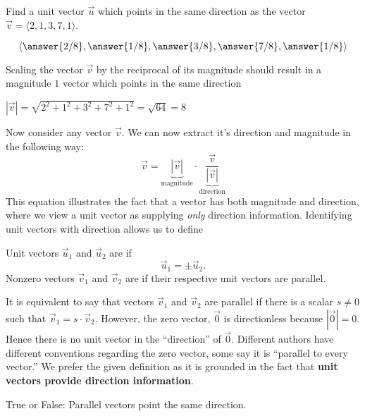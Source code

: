 \documentclass{ximera}
\begin{document}
\begin{question}
  Find a unit vector $\vec{u}$ which points in the same direction as the vector $\vec{v} = \langle 2,1,3,7,1\rangle$.
  \begin{prompt}
  \[
  \vector{
    \answer{2/8},
    \answer{1/8},
    \answer{3/8},
    \answer{7/8},
    \answer{1/8}}
  \]
  \end{prompt}
  \begin{hint}
    Scaling the vector $\vec{v}$ by the reciprocal of its magnitude should result in a magnitude $1$ vector which points in the same direction
  \end{hint}
  \begin{hint}
    $|\vec{v}| = \sqrt{2^2+1^2+3^2+7^2+1^2} = \sqrt{64} = 8$
  \end{hint}
\end{question}

Now consider any vector $\vec{v}$. We can now extract it's direction
and magnitude in the following way:
\[
\vec{v} = \underbrace{|\vec{v}|}_{\text{magnitude}} \cdot \underbrace{\frac{\vec{v}}{|\vec{v}|}}_{\text{direction}}
\]
This equation illustrates the fact that a vector has both magnitude
and direction, where we view a unit vector as supplying \textit{only}
direction information. Identifying unit vectors with direction allows
us to define 
\begin{definition}
Unit vectors $\vec u_1$ and $\vec u_2$ are  if
\[
\vec{u}_1 = \pm \vec{u}_2.
\]
Nonzero vectors $\vec v_1$ and $\vec v_2$ are  if their
respective unit vectors are parallel.
\end{definition}
It is equivalent to say that vectors $\vec v_1$ and $\vec v_2$ are
parallel if there is a scalar $s\neq 0$ such that $\vec v_1 =
s\cdot\vec v_2$. However, the zero vector, $\vec 0$ is directionless
because $|\vec{0}|=0$. Hence there is no unit vector in the
``direction'' of $\vec 0$. Different authors have different
conventions regarding the zero vector, some say it is ``parallel to
every vector.'' We prefer the given definition as it is grounded in
the fact that \textbf{unit vectors provide direction information}.

\begin{question}
  True or False: Parallel vectors point the same direction.
  \begin{prompt}
    \begin{multipleChoice}
    \end{multipleChoice}
  \end{prompt}
\end{question}
\end{document}

